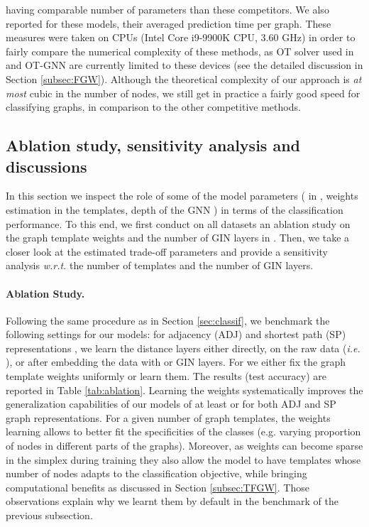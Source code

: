 \documentclass{article}
\begin{document}
having comparable number of parameters than these competitors. We also reported
for these models, their averaged prediction time per graph. These measures were
taken on CPUs (Intel Core i9-9900K CPU, 3.60 GHz) in order to fairly compare the
numerical complexity of these methods, as OT solver used in  and OT-GNN
are currently limited to these devices (see the detailed discussion in Section
\ref{subsec:FGW}). Although the theoretical complexity of our approach is
\emph{at most} cubic in the number of nodes, we still get in practice a fairly
good speed for classifying graphs, in comparison to the other competitive
methods.









\subsection{Ablation study, sensitivity analysis and discussions \label{sec:sensiti}}
In this section we inspect the role of some of the model parameters ( in , weights estimation
in the templates, depth of the GNN ) in terms of the classification performance. To this end, we first conduct on all datasets an
ablation study on the graph template weights
 and the number of GIN layers in . 
Then, we take a closer look at the
estimated  trade-off
parameters  and provide a sensitivity analysis \emph{w.r.t.} the number of templates and the number of GIN layers.

\paragraph{Ablation Study.} Following the same procedure as in Section \ref{sec:classif}, we benchmark the following settings for
our  models: for adjacency (ADJ) and
shortest path (SP) representations , we learn the distance layers either directly, on
the raw data (\textit{i.e.} ), or after embedding the data with  or  GIN layers. For  we
either fix the graph template weights  uniformly or learn them.
The results (test accuracy) are reported in Table \ref{tab:ablation}.
Learning the weights systematically improves the generalization capabilities of our
models of at least  or  for both ADJ and SP graph representations. For a given number of graph templates, the weights learning allows to better fit the specificities of the classes (e.g. varying proportion of nodes in different parts of the graphs). 
Moreover, as weights can become sparse in the simplex during training they also allow the model to have templates whose number of nodes adapts to the classification objective, while bringing computational benefits as discussed in Section \ref{subsec:TFGW}.
Those observations explain why we learnt them by default in the benchmark of the previous subsection.
\end{document}
